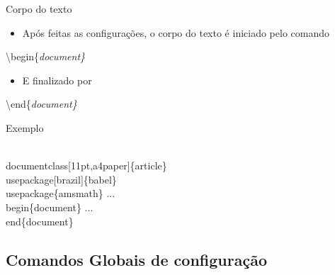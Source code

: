 \begin{frame}[fragile]{Corpo do texto}
    \begin{itemize}
    \item Após feitas as configurações, o corpo do texto é iniciado pelo comando
    \end{itemize}

    \alert{\textbackslash begin\{\it document\}}
    
    \begin{itemize}
    \item E finalizado por
    \end{itemize}

    \alert{\textbackslash end\{\it document\}}

    \begin{exampleblock}{Exemplo}
        \begin{semiverbatim}
\\documentclass[11pt,a4paper]\{article\}
\\usepackage[brazil]\{babel\}
\\usepackage\{amsmath\}
...
\\begin\{document\}
...
\\end\{document\}
\end{semiverbatim}
    \end{exampleblock}
\end{frame}

\subsection{Comandos Globais de configuração}

